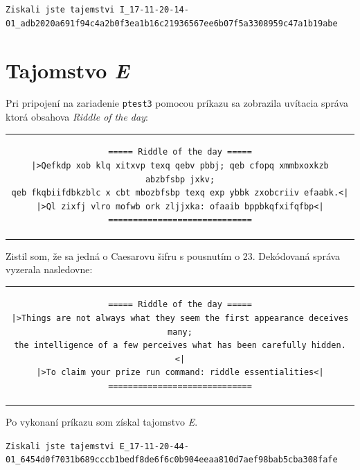 \documentclass[11pt,a4paper]{article}
\begin{document}
\begin{center}
\small{\texttt{Ziskali jste tajemstvi I\_17-11-20-14-01\_adb2020a691f94c4a2b0f3ea1b16c21936567ee6b07f5a3308959c47a1b19abe}}
\end{center}

\section{Tajomstvo \textit{E}}\label{sec:E}

Pri pripojení na zariadenie \texttt{ptest3} pomocou príkazu  sa zobrazila uvítacia správa ktorá obsahova \textit{Riddle of the day}:

\begin{center}
\begin{tabular}{c}
\begin{lstlisting}[basicstyle=\footnotesize]
===== Riddle of the day =====
|>Qefkdp xob klq xitxvp texq qebv pbbj; qeb cfopq xmmbxoxkzb abzbfsbp jxkv;
qeb fkqbiifdbkzblc x cbt mbozbfsbp texq exp ybbk zxobcriiv efaabk.<|
|>Ql zixfj vlro mofwb ork zljjxka: ofaaib bppbkqfxifqfbp<|
=============================
\end{lstlisting}
\end{tabular}
\end{center}

Zistil som, že sa jedná o Caesarovu šifru s pousnutím o 23. Dekódovaná správa vyzerala nasledovne:

\begin{center}
\begin{tabular}{c}
\begin{lstlisting}[basicstyle=\footnotesize]
===== Riddle of the day =====
|>Things are not always what they seem the first appearance deceives many;
the intelligence of a few perceives what has been carefully hidden.<|
|>To claim your prize run command: riddle essentialities<|
=============================
\end{lstlisting}
\end{tabular}
\end{center}

Po vykonaní príkazu  som získal tajomstvo \textit{E}.

\begin{center}
\small{\texttt{Ziskali jste tajemstvi E\_17-11-20-44-01\_6454d0f7031b689cccb1bedf8de6f6c0b904eeaa810d7aef98bab5cba308fafe}}
\end{center}
\end{document}
